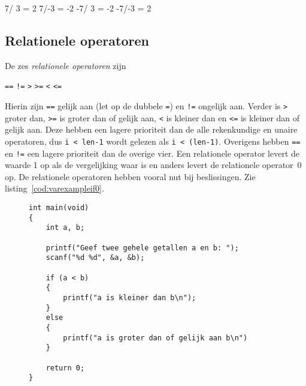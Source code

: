 \begin{dosbox}[title=Uitvoer van het deelprogramma.,label=fig:vardivproblem]
 7/ 3 =  2
 7/-3 = -2
-7/ 3 = -2
-7/-3 =  2
\end{dosbox}

\subsection{Relationele operatoren}
De zes \textsl{relationele operatoren} zijn

\hspace*{1em}\texttt{==} \quad \texttt{!=} \quad \texttt{>} \quad \texttt{>=} \quad \texttt{<} \quad \texttt{<=}

\indexop{==}\indexop{>}\indexop{>=}\indexop{<}\indexop{<=}
Hierin zijn \texttt{==} gelijk aan (let op de dubbele \texttt{=}) en \texttt{!=} ongelijk aan. Verder is \texttt{>} groter dan, \texttt{>=} is groter dan of gelijk aan, \texttt{<} is kleiner dan en \texttt{<=} is kleiner dan of gelijk aan. Deze hebben een lagere prioriteit dan de alle rekenkundige en unaire operatoren, dus \mbox{\texttt{i < len-1}} wordt gelezen als \texttt{i < (len-1)}. Overigens hebben \texttt{==} en \texttt{!=} een lagere prioriteit dan de overige vier. Een relationele operator levert de waarde 1 op als de vergelijking waar is en anders levert de relationele operator~0 op.
De relationele operatoren hebben vooral nut bij beslissingen. Zie listing~\ref{cod:varexampleif0}.

\begin{figure}[H]
\begin{lstlisting}[caption=Voorbeeld van een beslissing.,label=cod:varexampleif0]
int main(void)
{
    int a, b;
    
    printf("Geef twee gehele getallen a en b: ");
    scanf("%d %d", &a, &b);

    if (a < b)
    {
        printf("a is kleiner dan b\n");
    }
    else
    {
        printf("a is groter dan of gelijk aan b\n")
    }
    
    return 0;
}
\end{lstlisting}
\end{figure}


